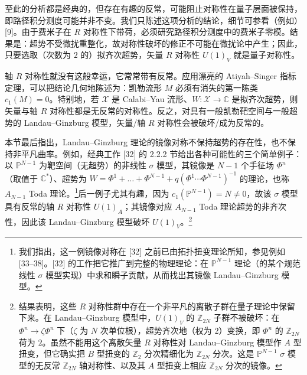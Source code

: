 至此的分析都是经典的，但存在有趣的反常，可能阻止对称性在量子层面被保持，即路径积分测度可能并非不变。我们只陈述这项分析的结论，细节可参看（例如）[9]。由于费米子在 $R$ 对称性下带荷，必须研究路径积分测度中的费米子零模。结果是：超势不受微扰重整化，故对称性破坏的修正不可能在微扰论中产生；因此，只要选取（次数为 $2$ 的）拟齐次超势，矢量 $R$ 对称性 $U(1)_V$ 就是量子对称性。

轴 $R$ 对称性就没有这般幸运，它常常带有反常。应用漂亮的 Atiyah--Singer 指标定理，可以把结论几何地陈述为：凯勒流形 $M$ 必须有消失的第一陈类 $c_1(M)=0$。特别地，若 $\mathcal{X}$ 是 Calabi--Yau 流形、$W:\mathcal{X}\to\mathbb{C}$ 是拟齐次超势，则矢量与轴 $R$ 对称性都是无反常的对称性。反之，对具有一般凯勒靶空间与一般超势的 Landau--Ginzburg 模型，矢量/轴 $R$ 对称性会被破坏/成为反常的。

本节最后指出，Landau--Ginzburg 理论的镜像对称不保持超势的存在性，也不保持非平凡曲率。例如，经典工作 [32] 的 2.2.2 节给出各种可能性的三个简单例子：以 $\mathbb{P}^{N-1}$ 为靶空间（无超势）的非线性 $\sigma$ 模型，其镜像是 $N-1$ 个手征场 $\Phi^n$（取值于 $\mathbb{C}^*$）、超势为 $W=\Phi^1+\dots+\Phi^{N-1}+q(\Phi^1\cdots\Phi^{N-1})^{-1}$ 的理论，也称 $A_{N-1}$ Toda 理论。\footnote{我们指出，这一例镜像对称在 [32] 之前已由拓扑扭变理论所知，参见例如 [33--38]。[32] 的工作把它推广到完整的物理理论：在 $\mathbb{P}^{N-1}$ 理论（的某个规范线性 $\sigma$ 模型实现）中求和瞬子贡献，从而找出其镜像 Landau--Ginzburg 模型。}后一例子尤其有趣，因为 $c_1(\mathbb{P}^{N-1})=N\neq0$，故该 $\sigma$ 模型具有反常的轴 $R$ 对称性 $U(1)_A$；其镜像对应 $A_{N-1}$ Toda 理论超势的非齐次性，因此该 Landau--Ginzburg 模型破坏 $U(1)_V$。\footnote{结果表明，这些 $R$ 对称性群中存在一个非平凡的离散子群在量子理论中保留下来。在 Landau--Ginzburg 模型中，$U(1)_V$ 的 $\mathbb{Z}_{2N}$ 子群不被破坏：在 $\Phi^n\to\zeta\Phi^n$ 下（$\zeta$ 为 $N$ 次单位根），超势齐次地（权为 $2$）变换，即 $\Phi^n$ 的 $\mathbb{Z}_{2N}$ 荷为 $2$。虽然不能用这个离散矢量 $R$ 对称性对 Landau--Ginzburg 模型作 $A$ 型扭变，但它确实把 $B$ 型扭变的 $\mathbb{Z}_2$ 分次精细化为 $\mathbb{Z}_{2N}$ 分次。这是 $\mathbb{P}^{N-1}$ $\sigma$ 模型的无反常 $\mathbb{Z}_{2N}$ 轴对称性、以及其 $A$ 型扭变上相应 $\mathbb{Z}_{2N}$ 分次的镜像。}
